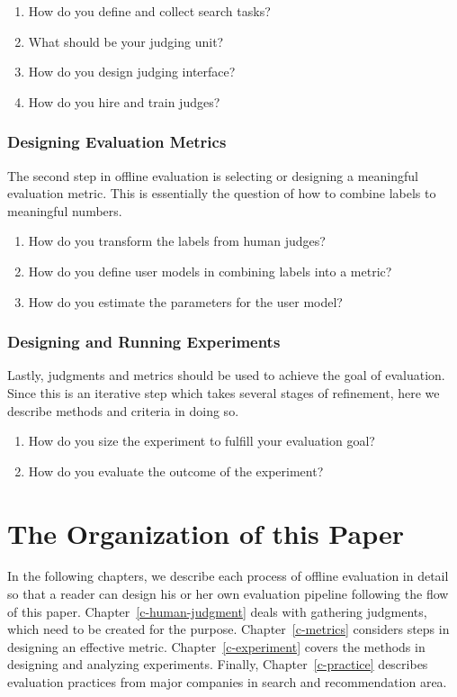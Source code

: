 \documentclass[openany]{now} %
\begin{document}
\begin{enumerate}
	\item How do you define and collect search tasks?
	\item What should be your judging unit?
	\item How do you design judging interface?
	\item How do you hire and train judges?
\end{enumerate}

\subsubsection{Designing Evaluation Metrics}

The second step in offline evaluation is selecting or designing a meaningful evaluation metric. This is essentially the question of how to combine labels to meaningful numbers.

\begin{enumerate}
	\item How do you transform the labels from human judges?
	\item How do you define user models in combining labels into a metric?
	\item How do you estimate the parameters for the user model?
\end{enumerate}

\subsubsection{Designing and Running Experiments}

Lastly, judgments and metrics should be used to achieve the goal of evaluation. Since this is an iterative step which takes several stages of refinement, here we describe methods and criteria in doing so. 

\begin{enumerate}
	\item How do you size the experiment to fulfill your evaluation goal?
	\item How do you evaluate the outcome of the experiment?
\end{enumerate}


\section{The Organization of this Paper}

In the following chapters, we describe each process of offline evaluation in detail so that a reader can design his or her own evaluation pipeline following the flow of this paper. Chapter~\ref{c-human-judgment} deals with gathering judgments, which need to be created for the purpose. Chapter~\ref{c-metrics} considers steps in designing an effective metric. Chapter~\ref{c-experiment} covers the methods in designing and analyzing experiments. Finally, Chapter~\ref{c-practice} describes evaluation practices from major companies in search and recommendation area.
\end{document}

